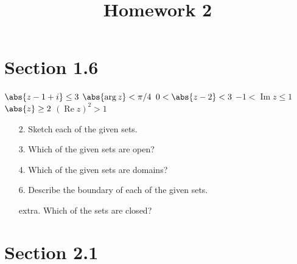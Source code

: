 \documentclass{article}
\DeclareMathOperator{\re}{Re}
\DeclareMathOperator{\im}{Im}
\begin{document}
\title{Homework 2}
\maketitle
\thispagestyle{fancy}

\section*{Section 1.6}

\begin{enumerate}[(a)]
		\ii $\abs{z-1+i}\le 3$
		\ii $\abs{\arg z} < \pi/4$
		\ii $0<\abs{z-2}<3$
		\ii $-1<\im z\le 1$
		\ii $\abs{z}\ge 2$
		\ii $(\re z)^2>1$
\end{enumerate}

\begin{itemize}
	\item[2.] Sketch each of the given sets.

	\item[3.] Which of the given sets are open?

	\item[4.] Which of the given sets are domains?

	\item[6.] Describe the boundary of each of the given sets.

	\item[extra.] Which of the sets are closed?
		
\end{itemize}

\section*{Section 2.1}
\end{document}
